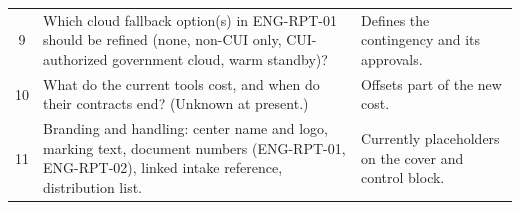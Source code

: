 {\begin{xltabular}{\textwidth}{@{}c Y{1.231} Y{0.769}@{}}
  9 & Which cloud fallback option(s) in ENG-RPT-01 should be refined (none, non-CUI only, CUI-authorized government cloud, warm standby)? & Defines the contingency and its approvals. \\
  10 & What do the current tools cost, and when do their contracts end? (Unknown at present.) & Offsets part of the new cost. \\
  11 & Branding and handling: center name and logo, marking text, document numbers (ENG-RPT-01, ENG-RPT-02), linked intake reference, distribution list. & Currently placeholders on the cover and control block. \\
  \bottomrule
\end{xltabular}}
